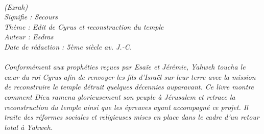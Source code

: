 \BFont
\noindent\hrulefill
{\footnotesize
\textit{
\bigskip
{\centering{}
\\(Ezrah)
\\Signifie : Secours
\\Thème : Edit de Cyrus et reconstruction du temple 
\\Auteur : Esdras
\\Date de rédaction : 5ème siècle av. J.-C.\\}
}
\textit{
\\Conformément aux prophéties reçues par Esaïe et Jérémie, Yahweh toucha le cœur du roi Cyrus afin de renvoyer les fils d’Israël sur leur terre avec la mission de reconstruire le temple détruit quelques décennies auparavant. Ce livre montre comment Dieu ramena glorieusement son peuple à Jérusalem et retrace la reconstruction du temple ainsi que les épreuves ayant accompagné ce projet. Il traite des réformes sociales et religieuses mises en place dans le cadre d’un retour total à Yahweh.\bigskip
}
}
\par\nobreak\noindent\hrulefill
